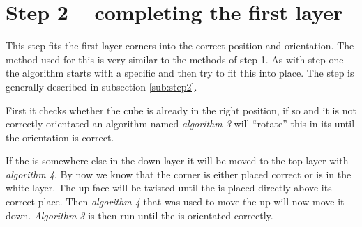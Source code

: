 \section{Step 2 -- completing the first layer}
This step fits the first layer corners into the correct position and orientation. The method used for this is very similar to the methods of step 1. 
As with step one the algorithm starts with a specific \cpiece{} and then try to fit this into place. 
The step is generally described in subsection \ref{sub:step2}.

First it checks whether the cube is already in the right position, if so and it is not correctly orientated an algorithm named \textit{algorithm 3} will ``rotate'' this \cpiece{} in its \cubicle{} until the orientation is correct. 

If the \cpiece{} is somewhere else in the down layer it will be moved to the top layer with \textit{algorithm 4}. 
By now we know that the corner \cpiece{} is either placed correct or is in the white layer. 
The up face will be twisted until the \cpiece{} is placed directly above its correct place. 
Then \textit{algorithm 4} that was used to move the \cpiece{} up will now move it down. 
\textit{Algorithm 3} is then run until the \cpiece{} is orientated correctly.
